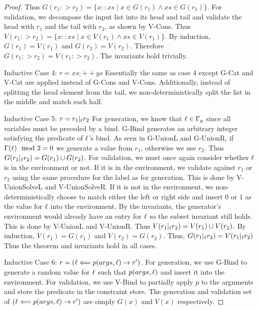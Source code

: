 \begin{proof}
        Thus $G(r_1 :> r_2) = \{x :: xs\;|\;x \in G(r_1) \land xs \in G(r_1)\}$.
        For validation, we decompose the input list into its head and tail and validate the head with $r_1$ and the tail with $r_2$, as shown by V-Cons.
        Thus $V(r_1 :> r_2) = \{x :: xs\;|\;x \in V(r_1) \land xs \in V(r_1)\}$.
        By induction, $G(r_1) = V(r_1)$ and $G(r_2) = V(r_2)$. Therefore $G(r_1 :> r_2) = V(r_1 :> r_2)$.
        The invariants hold trivially.
    \par Inductive Case 4: $r = xs :++ ys$
        Essentially the same as case 4 except G-Cat and V-Cat are applied instead of G-Cons and V-Cons.
        Additionally, instead of splitting the head element from the tail, we non-deterministically split the list in the middle and match each half.
    \par Inductive Case 5: $r = r_1 |_{\ell} r_2$
        For generation, we know that $\ell \in \Gamma_g$ since all variables must be preceded by a bind.
        G-Bind generates an arbitrary integer satisfying the predicate of $\ell$'s bind.
        As seen in G-UnionL and G-UnionR, if $\Gamma(\ell) \mod 2 = 0$ we generate a value from $r_1$, otherwise we use $r_2$. 
        Thus $G(r_1 |_{\ell} r_2) = G(r_1) \cup G(r_2)$.
        For validation, we must once again consider whether $\ell$ is in the environment or not. 
        If it is in the environment, we validate against $r_1$ or $r_2$ using the same procedure for the label as for generation.
        This is done by V-UnionSolveL and V-UnionSolveR.
        If it is not in the environment, we non-deterministically choose to match either the left or right side and insert $0$ or $1$ as the
        value for $\ell$ into the environment.
        By the invariants, the generator's environment would already have an entry for $\ell$ so the subset invariant still holds.
        This is done by V-UnionL and V-UnionR.
        Thus $V(r_1 |_{\ell} r_2) = V(r_1) \cup V(r_2).$
        By induction, $V(r_1) = G(r_1)$ and $V(r_2) = G(r_2)$. Thus, $G(r_1 |_{\ell} r_2) = V(r_1 |_{\ell} r_2)$
        Thus the theorem and invariants hold in all cases.
    \par Inductive Case 6: $r = (\ell \Longleftarrow p(args, \ell) \rightarrow r')$.
        For generation, we use G-Bind to generate a random value for $\ell$ such that $p(args, \ell)$ and insert it into the environment.
        For validation, we use V-Bind to partially apply $p$ to the arguments and store the predicate in the constraint store. 
        The generation and validation set of $(\ell \Longleftarrow p(args, \ell) \rightarrow r')$ are simply $G(x)$ and $V(x)$ respectively.

\end{proof}
